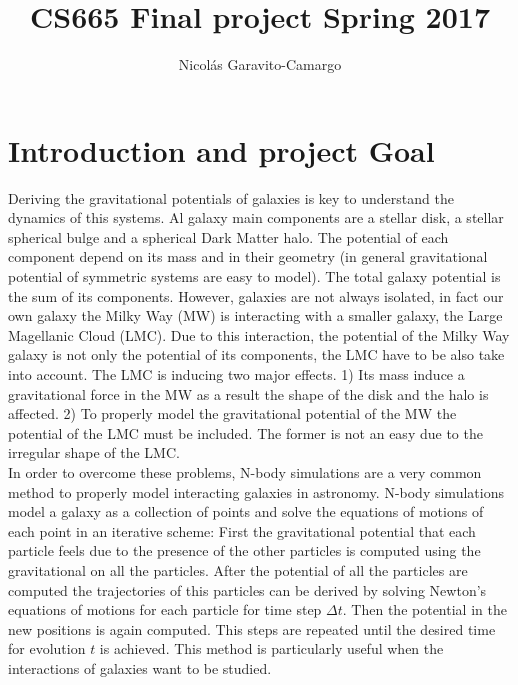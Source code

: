 \documentclass[14pt]{article}
\title{CS665 Final project Spring 2017}
\author{Nicol\'as Garavito-Camargo}
\date{}
\begin{document}
\maketitle

\section*{Introduction and project Goal}

Deriving the gravitational potentials of galaxies is key to
understand the dynamics of this systems. Al galaxy main components
are a stellar disk, a stellar spherical bulge and a spherical Dark Matter halo. The
potential of each component depend on its mass and in their geometry
(in general gravitational potential of symmetric systems are easy to
model). The total galaxy potential is the sum of its components. However,
galaxies are not always isolated, in fact our own galaxy the Milky
Way (MW) is interacting with a smaller galaxy, the Large Magellanic Cloud (LMC).
Due to this interaction, the potential of the Milky Way galaxy is not
only the potential of its components, the LMC have to be also take
into account. The LMC is inducing two major effects. 1) Its mass induce a
gravitational force in the MW as a result the shape of the disk and
the halo is affected. 2) To properly model the gravitational potential
of the MW the potential of the LMC must be included. The former is not 
an easy due to the irregular shape of the LMC.\\

In order to overcome these problems, N-body simulations are a very
common method to properly model interacting galaxies in astronomy. 
N-body simulations model a galaxy as a collection of points and solve
the equations of motions of each point in an iterative scheme: First 
the gravitational potential that each particle feels due to the presence of
the other particles is computed using the gravitational on all the
particles. After the potential of all the particles are
computed the trajectories of this particles can be derived by solving
Newton's equations of motions for each particle for time step $\Delta
t$. Then the potential in the new positions is again computed. This
steps are repeated until the desired time for evolution $t$ is
achieved. This method is particularly useful when the interactions of
galaxies want to be studied.\\
\end{document}
